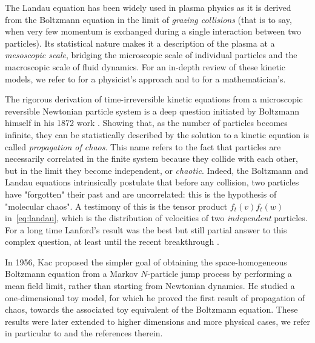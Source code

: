 \documentclass[11pt,a4paper]{article}
\theoremstyle{definition}
\theoremstyle{plain}
\begin{document}
The Landau equation has been widely
used in plasma physics as it is derived from the Boltzmann equation in the limit of \textit{grazing collisions} (that is to say, when very few momentum is exchanged during a single interaction between two particles). Its statistical nature makes it a description of the plasma at a \textit{mesoscopic scale}, bridging the microscopic scale of individual particles and the macroscopic scale of fluid dynamics.
For an in-depth review of these kinetic models, we refer to \cite{LifsicPitaevskij2008} for a physicist's approach and to \cite{Villani2002} for a mathematician's.

The rigorous derivation of time-irreversible kinetic equations from a microscopic reversible Newtonian particle system is a deep question initiated by Boltzmann himself in his 1872 work \cite{Boltzmann2003a}. Showing that, as the number of particles becomes infinite, they can be statistically described by the solution to a kinetic equation is called \textit{propagation of chaos}. This name refers to the fact that particles are necessarily correlated in the finite system because they collide with each other, but in the limit they become independent, or \textit{chaotic}. Indeed, the Boltzmann and Landau equations intrinsically postulate that before any collision, two particles have "forgotten" their past and are uncorrelated: this is the hypothesis of "molecular chaos". A testimony of this is the tensor product $f_t(v)f_t(w)$ in~\eqref{eq:landau}, which is the distribution of velocities of two \textit{independent} particles. For a long time Lanford's result \cite{Lanford1975} was the best but still partial answer to this complex question, at least until the recent breakthrough \cite{DengHaniMa2024}.

In 1956, Kac \cite{Kac1956} proposed the simpler goal of obtaining the space-homogeneous Boltzmann equation from a Markov $N$-particle jump process by performing a mean field limit, rather than starting from Newtonian dynamics. He studied a one-dimensional toy model, for which he proved the first result of propagation of chaos, towards the associated toy equivalent of the Boltzmann equation. These results were later extended to higher dimensions and more physical cases, we refer in particular to \cite{MischlerMouhot2012} and the references therein.
\end{document}
